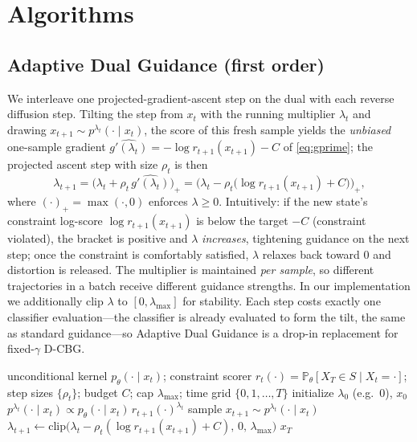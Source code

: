 \documentclass{article}
\begin{document}
\section{Algorithms}
\label{sec:algorithms}

\subsection{Adaptive Dual Guidance (first order)}
We interleave one projected-gradient-ascent step on the dual with each reverse diffusion step. Tilting the step from $x_t$ with the running multiplier $\lambda_t$ and drawing $x_{t+1}\sim p^{\lambda_t}(\cdot\mid x_t)$, the score of this fresh sample yields the \emph{unbiased} one-sample gradient $\widehat{g'(\lambda_t)}=-\log r_{t+1}(x_{t+1})-C$ of \eqref{eq:gprime}; the projected ascent step with size $\rho_t$ is then
\begin{equation}
\label{eq:lambda-update}
\lambda_{t+1}=\Big(\lambda_t+\rho_t\,\widehat{g'(\lambda_t)}\Big)_{+}
=\Big(\lambda_t-\rho_t\big(\log r_{t+1}(x_{t+1})+C\big)\Big)_{+},
\end{equation}
where $(\cdot)_+=\max(\cdot,0)$ enforces $\lambda\ge0$. Intuitively: if the new state's constraint log-score $\log r_{t+1}(x_{t+1})$ is below the target $-C$ (constraint violated), the bracket is positive and $\lambda$ \emph{increases}, tightening guidance on the next step; once the constraint is comfortably satisfied, $\lambda$ relaxes back toward $0$ and distortion is released. The multiplier is maintained \emph{per sample}, so different trajectories in a batch receive different guidance strengths. In our implementation we additionally clip $\lambda$ to $[0,\lambda_{\max}]$ for stability. Each step costs exactly one classifier evaluation---the classifier is already evaluated to form the tilt, the same as standard guidance---so Adaptive Dual Guidance is a drop-in replacement for fixed-$\gamma$ D-CBG.

\begin{algorithm}[t]
\caption{Adaptive Dual Guidance}
\label{alg:adg}
\begin{algorithmic}[1]
\Require unconditional kernel $p_\theta(\cdot\mid x_t)$; constraint scorer $r_t(\cdot)=\mathbb P_\theta[X_T\in S\mid X_t{=}\cdot]$; step sizes $\{\rho_t\}$; budget $C$; cap $\lambda_{\max}$; time grid $\{0,1,\dots,T\}$
\State initialize $\lambda_0$ (e.g.\ $0$), $x_0$
  \State $p^{\lambda_t}(\cdot\mid x_t)\propto p_\theta(\cdot\mid x_t)\,r_{t+1}(\cdot)^{\lambda_t}$ 
  \State sample $x_{t+1}\sim p^{\lambda_t}(\cdot\mid x_t)$
  \State $\lambda_{t+1}\gets \mathrm{clip}\big(\lambda_t-\rho_t(\log r_{t+1}(x_{t+1})+C),\,0,\,\lambda_{\max}\big)$ 
\EndFor
\State \Return $x_T$
\end{algorithmic}
\end{algorithm}
\end{document}
